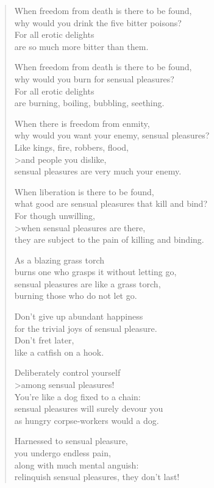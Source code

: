 \documentclass[12pt,openany]{book}%
\begin{document}
\begin{verse}
When freedom from death is there to be found, \\
why would you drink the five bitter poisons? \\
For all erotic delights \\
are so much more bitter than them. 

When freedom from death is there to be found, \\
why would you burn for sensual pleasures? \\
For all erotic delights \\
are burning, boiling, bubbling, seething. 

When there is freedom from enmity, \\
why would you want your enemy, sensual pleasures? \\
Like kings, fire, robbers, flood, \\>and people you dislike, \\
sensual pleasures are very much your enemy. 

When liberation is there to be found, \\
what good are sensual pleasures that kill and bind? \\
For though unwilling, \\>when sensual pleasures are there, \\
they are subject to the pain of killing and binding. 

As a blazing grass torch \\
burns one who grasps it without letting go, \\
sensual pleasures are like a grass torch, \\
burning those who do not let go. 

Don’t give up abundant happiness \\
for the trivial joys of sensual pleasure. \\
Don’t fret later, \\
like a catfish on a hook. 

Deliberately control yourself \\>among sensual pleasures! \\
You’re like a dog fixed to a chain: \\
sensual pleasures will surely devour you \\
as hungry corpse-workers would a dog. 

Harnessed to sensual pleasure, \\
you undergo endless pain, \\
along with much mental anguish: \\
relinquish sensual pleasures, they don’t last! 


\end{verse}
\end{document}
